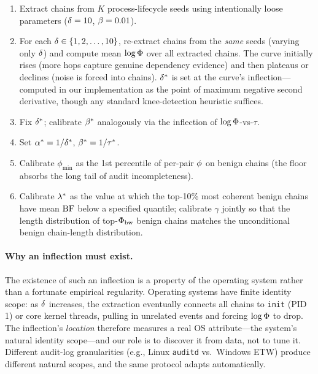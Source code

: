 \begin{enumerate}
\item Extract chains from $K$ process-lifecycle seeds using intentionally loose parameters ($\delta=10$, $\beta=0.01$).
\item For each $\delta \in \{1, 2, \dots, 10\}$, re-extract chains from the \emph{same} seeds (varying only $\delta$) and compute mean $\log \Phi$ over all extracted chains. The curve initially rises (more hops capture genuine dependency evidence) and then plateaus or declines (noise is forced into chains). $\delta^*$ is set at the curve's inflection---computed in our implementation as the point of maximum negative second derivative, though any standard knee-detection heuristic suffices.
\item Fix $\delta^*$; calibrate $\beta^*$ analogously via the inflection of $\log \Phi$-vs-$\tau$.
\item Set $\alpha^* = 1/\delta^*$, $\beta^* = 1/\tau^*$.
\item Calibrate $\phi_{\min}$ as the 1st percentile of per-pair $\phi$ on benign chains (the floor absorbs the long tail of audit incompleteness).
\item Calibrate $\lambda^*$ as the value at which the top-10\% most coherent benign chains have mean $\operatorname{BF}$ below a specified quantile; calibrate $\gamma$ jointly so that the length distribution of top-$\Phi_{\text{bw}}$ benign chains matches the unconditional benign chain-length distribution.
\end{enumerate}

\paragraph{Why an inflection must exist.} The existence of such an inflection is a property of the operating system rather than a fortunate empirical regularity. Operating systems have finite identity scope: as $\delta$ increases, the extraction eventually connects all chains to \texttt{init} (PID 1) or core kernel threads, pulling in unrelated events and forcing $\log \Phi$ to drop. The inflection's \emph{location} therefore measures a real OS attribute---the system's natural identity scope---and our role is to discover it from data, not to tune it. Different audit-log granularities (e.g., Linux \texttt{auditd} vs.~Windows ETW) produce different natural scopes, and the same protocol adapts automatically.

